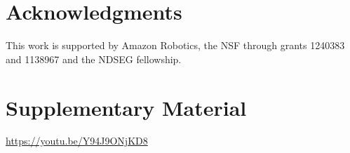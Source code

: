 \documentclass[letterpaper, 10 pt, conference]{ieeeconf}
\begin{document}










\section*{Acknowledgments}
This work is supported by Amazon Robotics, the NSF through grants 1240383 and 1138967 and the NDSEG fellowship.

\section*{Supplementary Material}
\url{https://youtu.be/Y94J9ONjKD8}



%


\end{document}
